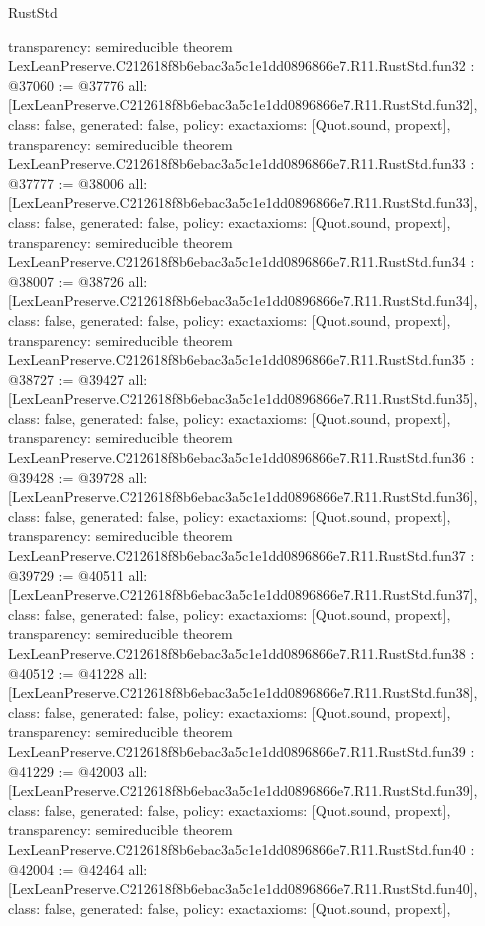 \begin{lexlean}{RustStd}
\begin{coremodule}
{  transparency: semireducible
}
theorem LexLeanPreserve.C212618f8b6ebac3a5c1e1dd0896866e7.R11.RustStd.fun32 : @37060 := @37776 {
  all: [LexLeanPreserve.C212618f8b6ebac3a5c1e1dd0896866e7.R11.RustStd.fun32],
  class: false,
  generated: false,
  policy: exact{axioms: [Quot.sound, propext]},
  transparency: semireducible
}
theorem LexLeanPreserve.C212618f8b6ebac3a5c1e1dd0896866e7.R11.RustStd.fun33 : @37777 := @38006 {
  all: [LexLeanPreserve.C212618f8b6ebac3a5c1e1dd0896866e7.R11.RustStd.fun33],
  class: false,
  generated: false,
  policy: exact{axioms: [Quot.sound, propext]},
  transparency: semireducible
}
theorem LexLeanPreserve.C212618f8b6ebac3a5c1e1dd0896866e7.R11.RustStd.fun34 : @38007 := @38726 {
  all: [LexLeanPreserve.C212618f8b6ebac3a5c1e1dd0896866e7.R11.RustStd.fun34],
  class: false,
  generated: false,
  policy: exact{axioms: [Quot.sound, propext]},
  transparency: semireducible
}
theorem LexLeanPreserve.C212618f8b6ebac3a5c1e1dd0896866e7.R11.RustStd.fun35 : @38727 := @39427 {
  all: [LexLeanPreserve.C212618f8b6ebac3a5c1e1dd0896866e7.R11.RustStd.fun35],
  class: false,
  generated: false,
  policy: exact{axioms: [Quot.sound, propext]},
  transparency: semireducible
}
theorem LexLeanPreserve.C212618f8b6ebac3a5c1e1dd0896866e7.R11.RustStd.fun36 : @39428 := @39728 {
  all: [LexLeanPreserve.C212618f8b6ebac3a5c1e1dd0896866e7.R11.RustStd.fun36],
  class: false,
  generated: false,
  policy: exact{axioms: [Quot.sound, propext]},
  transparency: semireducible
}
theorem LexLeanPreserve.C212618f8b6ebac3a5c1e1dd0896866e7.R11.RustStd.fun37 : @39729 := @40511 {
  all: [LexLeanPreserve.C212618f8b6ebac3a5c1e1dd0896866e7.R11.RustStd.fun37],
  class: false,
  generated: false,
  policy: exact{axioms: [Quot.sound, propext]},
  transparency: semireducible
}
theorem LexLeanPreserve.C212618f8b6ebac3a5c1e1dd0896866e7.R11.RustStd.fun38 : @40512 := @41228 {
  all: [LexLeanPreserve.C212618f8b6ebac3a5c1e1dd0896866e7.R11.RustStd.fun38],
  class: false,
  generated: false,
  policy: exact{axioms: [Quot.sound, propext]},
  transparency: semireducible
}
theorem LexLeanPreserve.C212618f8b6ebac3a5c1e1dd0896866e7.R11.RustStd.fun39 : @41229 := @42003 {
  all: [LexLeanPreserve.C212618f8b6ebac3a5c1e1dd0896866e7.R11.RustStd.fun39],
  class: false,
  generated: false,
  policy: exact{axioms: [Quot.sound, propext]},
  transparency: semireducible
}
theorem LexLeanPreserve.C212618f8b6ebac3a5c1e1dd0896866e7.R11.RustStd.fun40 : @42004 := @42464 {
  all: [LexLeanPreserve.C212618f8b6ebac3a5c1e1dd0896866e7.R11.RustStd.fun40],
  class: false,
  generated: false,
  policy: exact{axioms: [Quot.sound, propext]},
}
\end{coremodule}
\end{lexlean}
